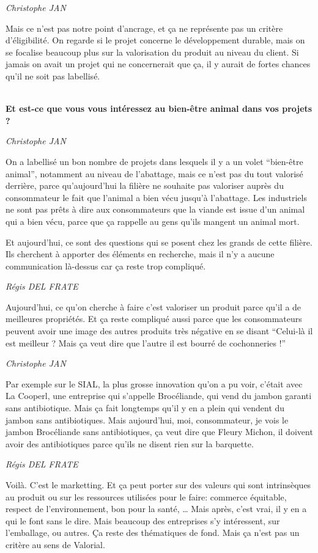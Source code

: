 \documentclass[a4paper,12pt]{report}
\begin{document}
	\emph{Christophe JAN}
	 
    Mais ce n’est pas notre point d’ancrage, et ça ne représente pas un critère d’éligibilité. On regarde si le projet concerne le développement durable, mais on se focalise beaucoup plus sur la valorisation du produit au niveau du client. Si jamais on avait un projet qui ne concernerait que ça, il y aurait de fortes chances qu’il ne soit pas labellisé.

	\textbf{\\Et est-ce que vous vous intéressez au bien-être animal dans vos projets ?}

	\emph{Christophe JAN}
	 
    On a labellisé un bon nombre de projets dans lesquels il y a un volet “bien-être animal”, notamment au niveau de l’abattage, mais ce n’est pas du tout valorisé derrière, parce qu’aujourd’hui la filière ne souhaite pas valoriser auprès du consommateur le fait que l’animal a bien vécu jusqu’à l’abattage. Les industriels ne sont pas prêts à dire aux consommateurs que la viande est issue d’un animal qui a bien vécu, parce que ça rappelle au gens qu’ils mangent un animal mort.
 
    Et aujourd’hui, ce sont des questions qui se posent chez les grands de cette filière. Ils cherchent à apporter des éléments en recherche, mais il n’y a aucune communication là-dessus car ça reste trop compliqué. 

	\emph{Régis DEL FRATE}
    
    Aujourd’hui, ce qu’on cherche à faire c’est valoriser un produit parce qu’il a de meilleures propriétés. Et ça reste compliqué aussi parce que les consommateurs peuvent avoir une image des autres produits très négative en se disant “Celui-là il est meilleur ? Mais ça veut dire que l’autre il est bourré de cochonneries !”

	\emph{Christophe JAN}
	 
    Par exemple sur le SIAL, la plus grosse innovation qu’on a pu voir, c’était avec La Cooperl, une entreprise qui s’appelle Brocéliande, qui vend du jambon garanti sans antibiotique. Mais ça fait longtemps qu’il y en a plein qui vendent du jambon sans antibiotiques. Mais aujourd’hui, moi, consommateur, je vois le jambon Brocéliande sans antibiotiques, ça veut dire que Fleury Michon, il doivent avoir des antibiotiques parce qu’ils ne disent rien sur la barquette.

	\emph{Régis DEL FRATE}
    
    Voilà. C’est le marketting. Et ça peut porter sur des valeurs qui sont intrinsèques au produit ou sur les ressources utilisées pour le faire: commerce équitable, respect de l’environnement, bon pour la santé, … Mais après, c’est vrai, il y en a qui le font sans le dire. Mais beaucoup des entreprises s’y intéressent, sur l’emballage, ou autres. Ça reste des thématiques de fond. Mais ça n’est pas un critère au sens de Valorial.
 
\end{document}
